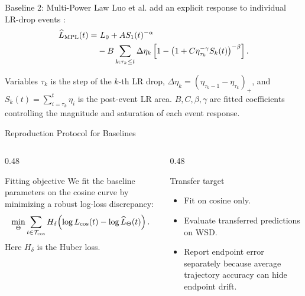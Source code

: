 \documentclass[fontset=fandol,aspectratio=169,10pt]{ctexbeamer}
\begin{document}
\begin{frame}{Baseline 2: Multi-Power Law}
  Luo et al. add an explicit response to individual LR-drop events
  \cite{luo2025multi}:
  \[
  \begin{aligned}
    \widehat L_{\rm MPL}(t)=&\ L_0+A S_1(t)^{-\alpha}\\
    &-B\sum_{k:\tau_k\le t}\Delta\eta_k
      \left[1-\left(1+C\eta_{\tau_k}^{-\gamma}
      S_k(t)\right)^{-\beta}\right].
  \end{aligned}
  \]
  \begin{block}{Variables}
    \(\tau_k\) is the step of the \(k\)-th LR drop,
    \(\Delta\eta_k=(\eta_{\tau_k-1}-\eta_{\tau_k})_+\),
    and \(S_k(t)=\sum_{i=\tau_k}^{t}\eta_i\) is the post-event LR area.
    \(B,C,\beta,\gamma\) are fitted coefficients controlling the magnitude
    and saturation of each event response.
  \end{block}
\end{frame}

\begin{frame}{Reproduction Protocol for Baselines}
  \begin{columns}[T,onlytextwidth]
    \begin{column}{0.48\textwidth}
      \begin{block}{Fitting objective}
        We fit the baseline parameters on the cosine curve by minimizing a robust
        log-loss discrepancy:
        \[
          \min_\Theta\sum_{t\in\mathcal T_{\rm cos}}
          H_\delta\!\left(\log L_{\rm cos}(t)-
          \log \widehat L_\Theta(t)\right).
        \]
        Here \(H_\delta\) is the Huber loss.
      \end{block}
    \end{column}
    \begin{column}{0.48\textwidth}
      \begin{block}{Transfer target}
        \begin{itemize}
          \item Fit on cosine only.
          \item Evaluate transferred predictions on WSD.
          \item Report endpoint error separately because average trajectory
          accuracy can hide endpoint drift.
        \end{itemize}
      \end{block}
    \end{column}
  \end{columns}
\end{frame}
\end{document}
